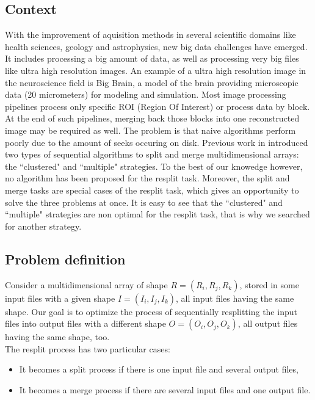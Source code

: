 \documentclass[conference]{IEEEtran}
\begin{document}
\subsection{Context}

With the improvement of aquisition methods in several scientific domains like health sciences, geology and astrophysics, new big data challenges have emerged. It includes processing a big amount of data, as well as processing very big files like ultra high resolution images. An example of a ultra high resolution image in the neuroscience field is Big Brain, a model of the brain providing microscopic data (20 micrometers) for modeling and simulation. Most image processing pipelines process only specific ROI (Region Of Interest) or process data by block. At the end of such pipelines, merging back those blocks into one reconstructed image may be required as well. The problem is that naive algorithms perform poorly due to the amount of seeks occuring on disk\cite{seqalgorithms}. Previous work in \cite{seqalgorithms} introduced two types of sequential algorithms to split and merge multidimensional arrays: the ``clustered" and ``multiple" strategies. To the best of our knowedge however, no algorithm has been proposed for the resplit task. Moreover, the split and merge tasks are special cases of the resplit task, which gives an opportunity to solve the three problems at once. It is easy to see that the ``clustered" and ``multiple" strategies are non optimal for the resplit task, that is why we searched for another strategy.

\subsection{Problem definition}

Consider a multidimensional array of shape $R = (R_i, R_j, R_k)$, stored in some input files with a given shape $I = (I_i, I_j, I_k)$, all input files having the same shape.
Our goal is to optimize the process of sequentially resplitting the input files into output files with a different shape $O = (O_i, O_j, O_k)$, all output files having the same shape, too. \\

The resplit process has two particular cases:
\begin{itemize}
  \item It becomes a split process if there is one input file and several output files,
  \item It becomes a merge process if there are several input files and one output file.
\end{itemize}
\end{document}
